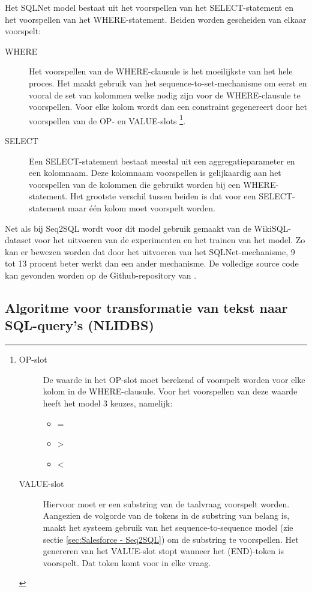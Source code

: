 Het SQLNet model bestaat uit het voorspellen van het SELECT-statement en het voorspellen van het WHERE-statement. Beiden worden gescheiden van elkaar voorspelt:
\begin{description}
	\item[WHERE] Het voorspellen van de WHERE-clausule is het moeilijkste van het hele proces. Het maakt gebruik van het sequence-to-set-mechanisme om eerst en vooral de set van kolommen welke nodig zijn voor de WHERE-clausule te voorspellen. Voor elke kolom wordt dan een constraint gegenereert door het voorspellen van de OP- en VALUE-slots 
	\footnote{
		\begin{description}
			\item[OP-slot] De waarde in het OP-slot moet berekend of voorspelt worden voor elke kolom in de WHERE-clausule. Voor het voorspellen van deze waarde heeft het model 3 keuzes, namelijk:
			\begin{itemize}
				\item =
				\item >
				\item <
			\end{itemize}
			\item[VALUE-slot] Hiervoor moet er een substring van de taalvraag voorspelt worden. Aangezien de volgorde van de tokens  in de substring van belang is, maakt het systeem gebruik van het sequence-to-sequence model (zie sectie \ref{sec:Salesforce - Seq2SQL}) om de substring te voorspellen. Het genereren van het VALUE-slot stopt wanneer het (END)-token is voorspelt. Dat token komt voor in elke vraag.
		\end{description}
	}.
	\item[SELECT] Een SELECT-statement bestaat meestal uit een aggregatieparameter en een kolomnaam. Deze kolomnaam voorspellen is gelijkaardig aan het voorspellen van de kolommen die gebruikt worden bij een WHERE-statement. Het grootste verschil tussen beiden is dat voor een SELECT-statement maar één kolom moet voorspelt worden.
\end{description}

Net als bij Seq2SQL wordt voor dit model gebruik gemaakt van de WikiSQL-dataset voor het uitvoeren van de experimenten en het trainen van het model. Zo kan er bewezen worden dat door het uitvoeren van het SQLNet-mechanisme, 9 tot 13 procent beter werkt dan een ander mechanisme. De volledige source code kan gevonden worden op de Github-repository van \textcite{sqlnet}.

\subsection{Algoritme voor transformatie van tekst naar SQL-query's (NLIDBS)}

